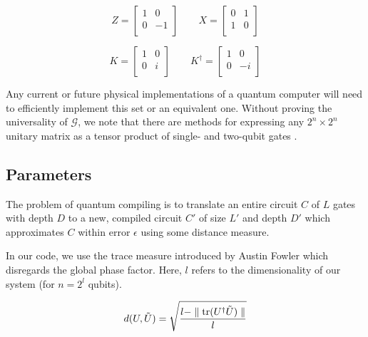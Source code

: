 \begin{displaymath}
Z = 
 \left[
  \begin{array}{cc}
    1 & 0 \\
    0 & -1 \\
  \end{array} \right]
\qquad
X = 
 \left[
  \begin{array}{cc}
    0 & 1 \\
    1 & 0 \\
  \end{array} \right]
\end{displaymath}

\begin{displaymath}
K = 
 \left[
  \begin{array}{cc}
    1 & 0 \\
    0 & i \\
  \end{array} \right]
\qquad
K^{\dagger} = 
 \left[
  \begin{array}{cc}
    1 & 0 \\
    0 & -i \\
  \end{array} \right]
\end{displaymath}

Any current or future physical implementations of a quantum
computer will need to efficiently implement this set or an equivalent one.
Without proving the universality of $\mathcal{G}$, we note that there are
methods for expressing any $2^n \times 2^n$ unitary matrix as a
tensor product of single- and two-qubit gates \cite{Bremner2002}.

\subsection{Parameters}

The problem of quantum compiling is to translate
an entire circuit $C$ of $L$ gates with depth
$D$ to a new, compiled circuit $C'$ of size $L'$ and depth $D'$ which approximates
$C$ within error $\epsilon$ using some distance measure.

In our code, we use the trace measure introduced by Austin Fowler which disregards
the global phase factor. Here,
$l$ refers to the dimensionality
of our system (for $n = 2^l$ qubits).

\begin{equation}
d(U,\tilde{U}) = \sqrt{\frac{l - \parallel \mathrm{tr}(U^\dagger \tilde{U}) \parallel}{l}}
\end{equation}

